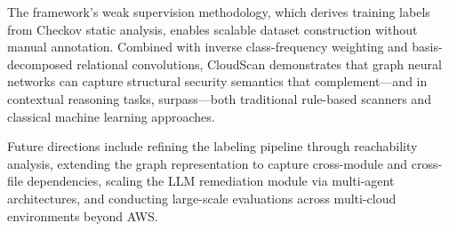 \documentclass[conference]{IEEEtran}
\begin{document}
The framework's weak supervision methodology, which derives training labels from Checkov static analysis, enables scalable dataset construction without manual annotation. Combined with inverse class-frequency weighting and basis-decomposed relational convolutions, CloudScan demonstrates that graph neural networks can capture structural security semantics that complement---and in contextual reasoning tasks, surpass---both traditional rule-based scanners and classical machine learning approaches.

Future directions include refining the labeling pipeline through reachability analysis, extending the graph representation to capture cross-module and cross-file dependencies, scaling the LLM remediation module via multi-agent architectures, and conducting large-scale evaluations across multi-cloud environments beyond AWS.

\end{document}
